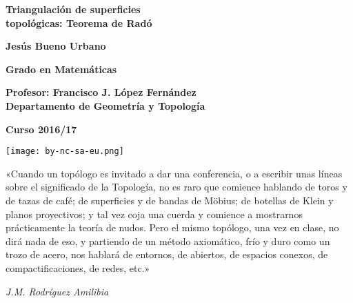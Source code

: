 \documentclass[12pt,a4paper,oldfontcommands]{memoir}
\begin{document}
	
\newtheorem{definition}{Definición}[section]
\newtheorem{proposition}{Proposición}[section]
\newtheorem{lemma}{Lema}[section]
\newtheorem{corollary}{Corolario}[section]
\newtheorem{theorem}{Teorema}[section]
\newtheorem{example}{Ejemplo}[section]
\newtheorem{remark}{Nota}[section]

\thispagestyle{empty}
\BgThispage
{
\vspace*{\fill}

\sffamily
\centering
\Large
\vspace*{\fill}

\textbf{{\huge Triangulación de superficies\\ topológicas: Teorema de Radó}}

\vspace{3.5cm}

\textbf{{\LARGE Jesús Bueno Urbano}}

\vspace{0.5cm}

\textbf{Grado en Matemáticas}

\vspace{2cm}

\textbf{Profesor: Francisco J. López Fernández\\
Departamento de Geometría y Topología}

\vspace{2cm}

\textbf{Curso 2016/17}

\vspace{3cm}

\begin{minipage}{3cm}
\centering
\texttt{[image: by-nc-sa-eu.png]}
\end{minipage}

\vspace*{\fill}
}

\cleardoublepage
\thispagestyle{empty}
\vspace*{\fill}
\epigraph{«Cuando un topólogo es invitado a dar una conferencia, o a escribir unas líneas sobre el significado de la Topología, no es raro que comience hablando de toros y de tazas de café; de superficies y de bandas de Möbius; de botellas de Klein y planos proyectivos; y tal vez coja una cuerda y comience a mostrarnos prácticamente la teoría de nudos. Pero el mismo topólogo, una vez en clase, no dirá nada de eso, y partiendo de un método axiomático, frío y duro como un trozo de acero, nos hablará de entornos, de abiertos, de espacios conexos, de compactificaciones, de redes, etc.»}{{ \em J.M. Rodríguez Amilibia}}
\vspace*{\fill}
\clearpage
\end{document}
